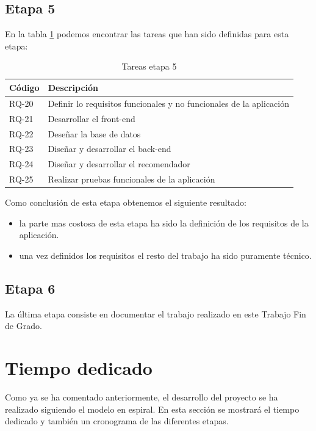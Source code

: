 \subsection{Etapa 5}

En la tabla \ref{tabla:requisitosEtapa5} podemos encontrar las tareas que han sido definidas para esta etapa:

\begin{table}[H]
\begin{center}
\begin{tabular}{|p{1.5cm}| p{10.5cm}|}
\hline 
Código & Descripción \\
\hline \hline
RQ-20 & Definir lo requisitos funcionales y no funcionales de la aplicación\\ \hline
RQ-21 & Desarrollar el front-end\\ \hline
RQ-22 & Deseñar la base de datos\\ \hline
RQ-23 & Diseñar y desarrollar el back-end\\ \hline
RQ-24 & Diseñar y desarrollar el recomendador\\ \hline
RQ-25 & Realizar pruebas funcionales de la aplicación\\ \hline
\end{tabular}
\caption{Tareas etapa 5}
\label{tabla:requisitosEtapa5}
\end{center}
\end{table}

Como conclusión de esta etapa obtenemos el siguiente resultado:
\begin{itemize}
	\item la parte mas costosa de esta etapa ha sido la definición de los requisitos de la aplicación.
	\item una vez definidos los requisitos el resto del trabajo ha sido puramente técnico. 
\end{itemize}


\subsection{Etapa 6}

La última etapa consiste en documentar el trabajo realizado en este Trabajo Fin de Grado.

\newpage

\section{Tiempo dedicado}

Como ya se ha comentado anteriormente, el desarrollo del proyecto se ha realizado siguiendo el modelo en espiral. En esta sección se mostrará el tiempo dedicado y también un cronograma de las diferentes etapas.

